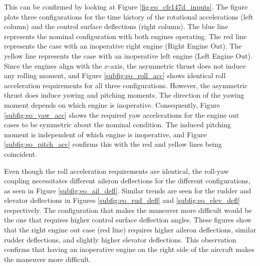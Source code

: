 This can be confirmed by looking at Figure \ref{fig:eo_cfr147d_inputs}. 
The figure plots three configurations for the time history of the rotational accelerations (left column) and the control surface deflections (right column).
The blue line represents the nominal configuration with both engines operating. 
The red line represents the case with an inoperative right engine (Right Engine Out).
The yellow line represents the case with an inoperative left engine (Left Engine Out).
Since the engines align with the $x$-axis, the asymmetric thrust does not induce any rolling moment, and Figure \ref{subfig:eo_roll_acc} shows identical roll acceleration requirements for all three configurations.
However, the asymmetric thrust does induce yawing and pitching moments. 
The direction of the yawing moment depends on which engine is inoperative.
Consequently, Figure \ref{subfig:eo_yaw_acc} shows the required yaw accelerations for the engine out cases to be symmetric about the nominal condition. 
The induced pitching moment is independent of which engine is inoperative, and Figure \ref{subfig:eo_pitch_acc} confirms this with the red and yellow lines being coincident. 

Even though the roll acceleration requirements are identical, the roll-yaw coupling necessitates different aileron deflections for the different configurations, as seen in Figure \ref{subfig:eo_ail_defl}. 
Similar trends are seen for the rudder and elevator deflections in Figures \ref{subfig:eo_rud_defl} and \ref{subfig:eo_elev_defl} respectively. 
The configuration that makes the maneuver more difficult would be the one that requires higher control surface deflection angles. 
These figures show that the right engine out case (red line) requires higher aileron deflections, similar rudder deflections, and slightly higher elevator deflections. 
This observation confirms that having an inoperative engine on the right side of the aircraft makes the maneuver more difficult.

